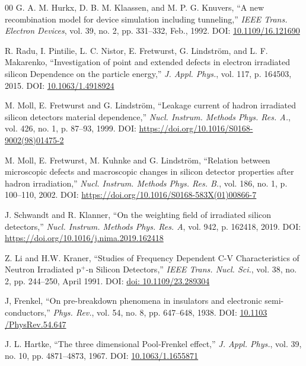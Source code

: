 \documentclass[final, 5p, times]{elsarticle}
\begin{document}
\begin{thebibliography}{00}
 G. A. M. Hurkx, D. B. M. Klaassen, and M. P. G. Knuvers, ``A new
recombination model for device simulation including tunneling,'' \textit{IEEE
Trans. Electron Devices}, vol. 39, no. 2, pp. 331--332, Feb., 1992. 
DOI: \href{https://ieeexplore.ieee.org/document/121690}{10.1109/16.121690}

 R. Radu, I. Pintilie, L. C. Nistor, E. Fretwurst, G. Lindstr\"om,
and L. F. Makarenko, ``Investigation of point and extended defects in electron
irradiated silicon Dependence on the particle energy,'' \textit{J. Appl.
Phys.}, vol. 117, p. 164503, 2015. 
DOI: \href{https://doi.org/10.1063/1.4918924}{10.1063/1.4918924}

 M. Moll, E. Fretwurst and G. Lindstr\"om, ``Leakage current of
hadron irradiated silicon detectors material dependence,'' \textit{Nucl.
Instrum. Methods Phys. Res. A.}, vol. 426, no. 1, p. 87--93, 1999. 
DOI:
\href{https://www.sciencedirect.com/science/article/pii/S0168900298014752}
{https://doi.org/10.1016/S0168-9002(98)01475-2}

 M. Moll, E. Fretwurst, M. Kuhnke and G. Lindstr\"om, ``Relation
between microscopic defects and macroscopic changes in silicon detector
properties after hadron irradiation,'' \textit{Nucl. Instrum. Methods Phys.
Res. B.}, vol. 186, no. 1, p. 100--110, 2002. 
DOI:
\href{https://www.sciencedirect.com/science/article/pii/S0168583X01008667}
{https://doi.org/10.1016/S0168-583X(01)00866-7}


 J. Schwandt and R. Klanner, ``On the weighting field of irradiated silicon detectors,'' \textit{Nucl. Instrum. Methods Phys. Res. A}, vol. 942, p. 162418, 2019. 
DOI: \href{https://doi.org/10.1016/j.nima.2019.162418}{https://doi.org/10.1016/j.nima.2019.162418}

 Z. Li and H.W. Kraner, ``Studies of Frequency Dependent C-V Characteristics
of Neutron Irradiated $\text{p}^+$-n Silicon Detectors,'' \textit{IEEE Trans. Nucl. Sci.}, vol. 38, no. 2, pp. 244--250, April 1991.
DOI: \href{https://ieeexplore.ieee.org/document/289304}{doi: 10.1109/23.289304}



 J, Frenkel, ``On pre-breakdown phenomena in insulators and
electronic semi-conductors,'' \textit{Phys. Rev.}, vol. 54, no. 8, pp.
647--648, 1938. 
DOI:
\href{https://journals.aps.org/pr/abstract/10.1103/PhysRev.54.647}{10.1103
/PhysRev.54.647}

 J. L. Hartke, ``The three dimensional Pool-Frenkel effect,''
\textit{J. Appl. Phys.}, vol. 39, no. 10, pp. 4871--4873, 1967.
DOI: \href{https://aip.scitation.org/doi/10.1063/1.1655871}{10.1063/1.1655871}



\end{thebibliography}
\end{document}

